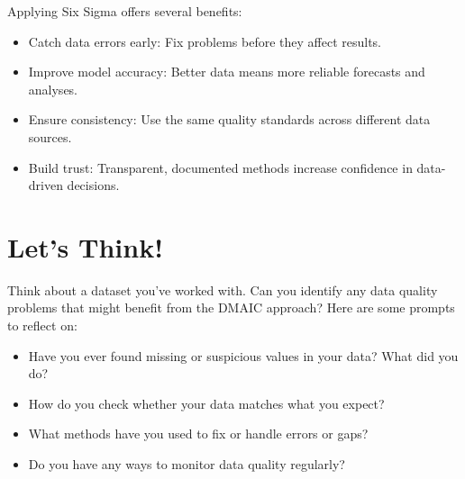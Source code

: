Applying Six Sigma offers several benefits:

\begin{itemize}
  \item Catch data errors early: Fix problems before they affect results.
  \item Improve model accuracy: Better data means more reliable forecasts and analyses.
  \item Ensure consistency: Use the same quality standards across different data sources.
  \item Build trust: Transparent, documented methods increase confidence in data-driven decisions.
\end{itemize}

\section*{Let’s Think!}

Think about a dataset you’ve worked with. Can you identify any data quality problems that might benefit from the DMAIC approach? Here are some prompts to reflect on:

\begin{itemize}
  \item Have you ever found missing or suspicious values in your data? What did you do?
  \item How do you check whether your data matches what you expect?
  \item What methods have you used to fix or handle errors or gaps?
  \item Do you have any ways to monitor data quality regularly?
\end{itemize}
